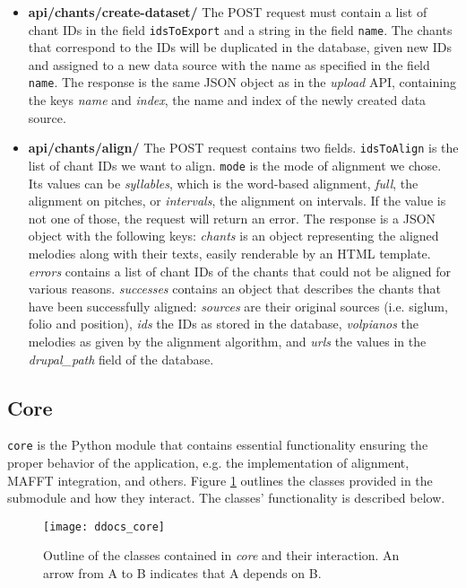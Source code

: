 \begin{itemize}
\item \textbf{api/chants/create-dataset/} The POST request must contain a list of chant IDs in the field \verb|idsToExport| and a string in the field \verb|name|. The chants
that correspond to the IDs will be duplicated in the database, given new IDs and assigned to a new data source with the name as specified in the field \verb|name|.
The response is the same JSON object as in the \emph{upload} API, containing the keys \emph{name} and \emph{index}, the name and index of the newly created data source.

\item \textbf{api/chants/align/} The POST request contains two fields. \verb|idsToAlign| is the list of chant IDs we want to align. \verb|mode| is the mode of alignment we chose.
Its values can be \emph{syllables}, which is the word-based alignment, \emph{full}, the alignment on pitches, or \emph{intervals}, the alignment on intervals. If the
value is not one of those, the request will return an error. The response is a JSON object with the following keys: \emph{chants} is an object representing the
aligned melodies along with their texts, easily renderable by an HTML template. \emph{errors} contains a list of chant IDs of the chants that could not be aligned for
various reasons. \emph{successes} contains an object that describes the chants that have been successfully aligned: \emph{sources} are their original sources (i.e.
siglum, folio and position), \emph{ids} the IDs as stored in the database, \emph{volpianos} the melodies as given by the alignment algorithm, and \emph{urls} the
values in the \emph{drupal\_path} field of the database.

\end{itemize}

\subsection{Core}

\verb|core| is the Python module that contains essential functionality ensuring the proper behavior of the application, e.g. the implementation of alignment,
MAFFT integration, and others. Figure \ref{fig:core} outlines the classes provided in the submodule and how they interact. The classes' functionality
is described below.

\begin{figure}[!h]
\centering
\texttt{[image: ddocs\_core]}
\caption{Outline of the classes contained in \emph{core} and their interaction. An arrow from A to B indicates that A depends on B.}
\label{fig:core}
\end{figure}

